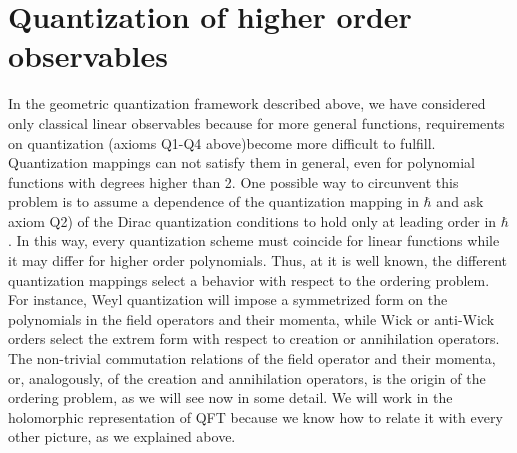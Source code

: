 \documentclass[12pt]{article}%
\begin{document}
\section{Quantization of higher order observables}
\label{sec:orderings}

In the geometric quantization framework described above, we have considered only classical linear observables because for more general functions, requirements on quantization  (axioms Q1-Q4 above)become more difficult to fulfill. Quantization mappings can not satisfy them in general, even for polynomial functions with degrees higher than 2. One possible way to circunvent this problem is to assume a dependence of the quantization mapping in $\hbar$ and ask axiom Q2) of the Dirac quantization conditions to hold only at leading order in $\hbar$. In this way, every quantization scheme must coincide for linear functions while it may differ for higher order polynomials. Thus, at it is well known, the different quantization mappings select a behavior with respect to the ordering problem. For instance, Weyl quantization will impose a symmetrized form on the polynomials in the field operators and their momenta,  while Wick or anti-Wick orders select the extrem form with respect to creation or annihilation operators. The non-trivial commutation relations of the field operator and their momenta, or, analogously, of the creation and annihilation operators, is the origin of the ordering problem, as we will see now  in some detail. We will work in the holomorphic representation of QFT because we know how to relate it with every other picture, as we explained above. 
\end{document}
